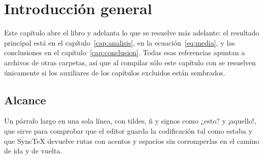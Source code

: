 \chapter{Introducción general}\label{cap:intro}

Este capítulo abre el libro y adelanta lo que se resuelve más adelante: el resultado principal está en el capítulo~\ref{cap:analisis}, en la ecuación~\eqref{eq:media}, y las conclusiones en el capítulo~\ref{cap:conclusion}. Todas esas referencias apuntan a archivos de otras carpetas, así que al compilar sólo este capítulo con \verb|| se resuelven únicamente si los auxiliares de los capítulos excluidos están sembrados.

\section{Alcance}\label{sec:alcance}

Un párrafo largo en una sola línea, con tildes, ñ y signos como ¿esto? y ¡aquello!, que sirve para comprobar que el editor guarda la codificación tal como estaba y que SyncTeX devuelve rutas con acentos y espacios sin corromperlas en el camino de ida y de vuelta.
